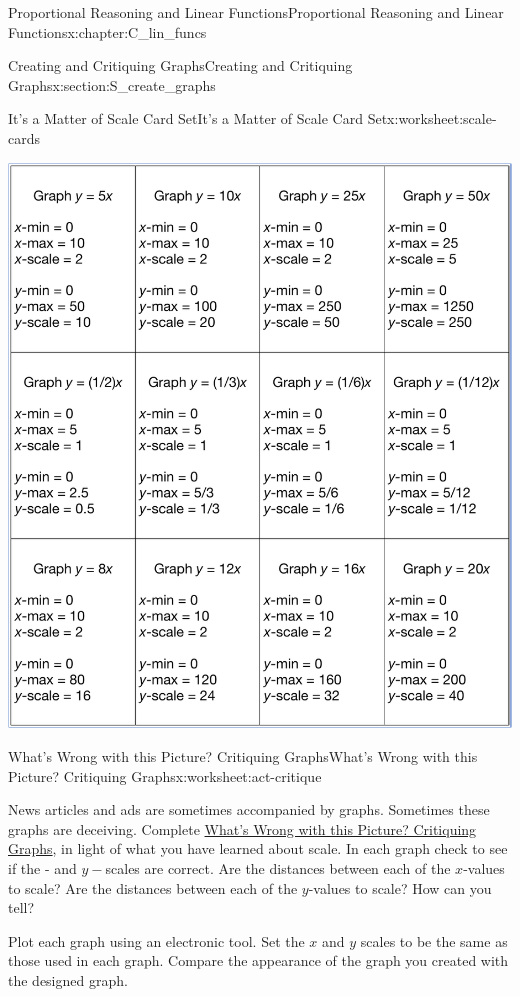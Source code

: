 \documentclass[oneside,10pt,]{book}
\numberwithin{equation}{chapter}
\begin{document}
\begin{chapterptx}{Proportional Reasoning and Linear Functions}{}{Proportional Reasoning and Linear Functions}{}{}{x:chapter:C_lin_funcs}
\begin{sectionptx}{Creating and Critiquing Graphs}{}{Creating and Critiquing Graphs}{}{}{x:section:S_create_graphs}
\begin{worksheet-subsection}{It's a Matter of Scale Card Set}{}{It's a Matter of Scale Card Set}{}{}{x:worksheet:scale-cards}
\begin{image}{0}{1}{0}
\includegraphics[width=\linewidth]{external/scale-cards-2.pdf}
\end{image}%
\end{worksheet-subsection}
\restoregeometry
%
%
\typeout{************************************************}
\typeout{************************************************}
%
\begin{worksheet-subsection}{What's Wrong with this Picture? Critiquing Graphs}{}{What's Wrong with this Picture? Critiquing Graphs}{}{}{x:worksheet:act-critique}
\begin{introduction}{}%
News articles and ads are sometimes accompanied by graphs. Sometimes these graphs are deceiving. Complete \hyperref[x:worksheet:act-critique]{What's Wrong with this Picture? Critiquing Graphs}, in light of what you have learned about scale. In each graph check to see if the \(\)- and \(y-\)scales are correct. Are the distances between each of the \(x\)-values to scale?  Are the distances between each of the \(y\)-values to scale? How can you tell?%
\par
Plot each graph using an electronic tool. Set the \(x\) and \(y\) scales to be the same as those used in each graph. Compare the appearance of the graph you created with the designed graph.%

\end{introduction}
\end{worksheet-subsection}
\end{sectionptx}
\end{chapterptx}
\end{document}
